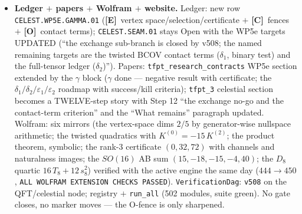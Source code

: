\documentclass[11pt]{article}
\providecommand{\mE}{\textbf{[E]}}\providecommand{\mC}{\textbf{[C]}}
\providecommand{\mO}{\textbf{[O]}}\providecommand{\mX}{\textbf{[X]}}
\begin{document}
\begin{itemize}[leftmargin=1.5em]
$+$ sharpened; flipped rule $m{+}j{-}j'$: $\Phi_{T_3}$ kill flip-invariant, $\Phi_P$
rule-dependent; $SO(16)$: odd classes EMPTY and AB sum $(15,-18,-15,-4,40)$ --- $T_5$ does not
even cancel ($E_8$ doubly special); $D_8$: $16\,T_8{+}12\,s_8^2$, no $T_3$ structure --- the
question cannot even be posed. Number fences \mC\ only: $32=(h,h){+}(h',h')=20{+}12$,
$72=2\tilde\lambda^2_{e_8}$.
\item \textbf{Ledger $+$ papers $+$ Wolfram $+$ website.} Ledger: new row
\texttt{CELEST.WP5E.GAMMA.01} (\mE\ vertex space/selection/certificate $+$ \mC\ fences $+$ \mO\
contact terms); \texttt{CELEST.SEAM.01} stays Open with the WP5e targets UPDATED (``the exchange
sub-branch is closed by v508; the named remaining targets are the twisted BCOV contact terms
($\delta_1$, binary test) and the full-tensor ledger ($\delta_2$)''). Papers:
\texttt{tfpt\_research\_contracts} WP5e section extended by the $\gamma$ block ($\gamma$ done ---
negative result with certificate; the $\delta_1/\delta_2/\varepsilon_1/\varepsilon_2$ roadmap with
success/kill criteria); \texttt{tfpt\_3} celestial section becomes a TWELVE-step story with Step 12
``the exchange no-go and the contact-term criterion'' and the ``What remains'' paragraph updated.
Wolfram: six mirrors (the vertex-space dims $2/5$ by generator-wise nullspace arithmetic; the
twisted quadratics with $K^{(0)}=-15\,K^{(2)}$; the product theorem, symbolic; the rank-$3$
certificate $(0,32,72)$ with channels and naturalness images; the $SO(16)$ AB sum
$(15,-18,-15,-4,40)$; the $D_8$ quartic $16\,T_8{+}12\,s_8^2$) verified with the active engine the
same day ($444\to450$, \texttt{ALL WOLFRAM EXTENSION CHECKS PASSED}). \texttt{VerificationDag}:
\texttt{v508} on the QFT/celestial node; registry $+$ \texttt{run\_all} (502 modules, suite
green). No gate closes, no marker moves --- the O-fence is only sharpened.
\end{itemize}
\end{document}

